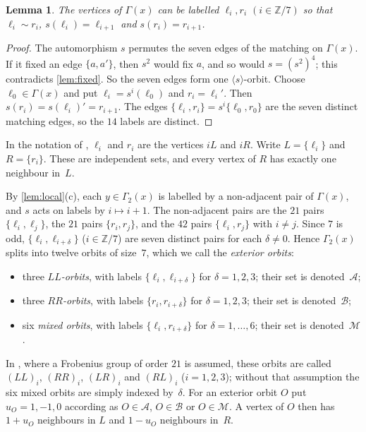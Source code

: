 \documentclass[11pt,a4paper]{amsart}
\newtheorem{lemma}[theorem]{Lemma}
\theoremstyle{definition}
\theoremstyle{remark}
\newcommand{\Z}{\mathbb{Z}}
\newcommand{\cA}{\mathcal{A}}
\newcommand{\cB}{\mathcal{B}}
\newcommand{\cM}{\mathcal{M}}
\begin{document}
\begin{lemma}\label{lem:labels}
The vertices of $\Gamma(x)$ can be labelled $\ell_i,r_i$ $(i\in\Z/7)$ so that $\ell_i\sim r_i$,
$s(\ell_i)=\ell_{i+1}$ and $s(r_i)=r_{i+1}$.
\end{lemma}

\begin{proof}
The automorphism $s$ permutes the seven edges of the matching on $\Gamma(x)$. If it fixed an edge
$\{a,a'\}$, then $s^2$ would fix $a$, and so would $s=(s^2)^4$; this contradicts \cref{lem:fixed}. So the
seven edges form one $\langle s\rangle$-orbit. Choose $\ell_0\in\Gamma(x)$ and put $\ell_i=s^i(\ell_0)$ and
$r_i=\ell_i'$. Then $s(r_i)=s(\ell_i)'=r_{i+1}$. The edges $\{\ell_i,r_i\}=s^i\{\ell_0,r_0\}$ are the seven
distinct matching edges, so the $14$ labels are distinct.
\end{proof}

In the notation of \cite{CW25}, $\ell_i$ and $r_i$ are the vertices $iL$ and $iR$. Write $L=\{\ell_i\}$ and
$R=\{r_i\}$. These are independent sets, and every vertex of $R$ has exactly one neighbour in~$L$.

By \cref{lem:local}(c), each $y\in\Gamma_2(x)$ is labelled by a non-adjacent pair of $\Gamma(x)$, and $s$ acts
on labels by $i\mapsto i+1$. The non-adjacent pairs are the $21$ pairs $\{\ell_i,\ell_j\}$, the $21$ pairs
$\{r_i,r_j\}$, and the $42$ pairs $\{\ell_i,r_j\}$ with $i\neq j$. Since $7$ is odd, $\{\ell_i,\ell_{i+\delta}\}$
($i\in\Z/7$) are seven distinct pairs for each $\delta\neq0$. Hence $\Gamma_2(x)$ splits into twelve orbits
of size~$7$, which we call the \emph{exterior orbits}:
\begin{itemize}
\item three \emph{$LL$-orbits}, with labels $\{\ell_i,\ell_{i+\delta}\}$ for $\delta=1,2,3$; their set is denoted~$\cA$;
\item three \emph{$RR$-orbits}, with labels $\{r_i,r_{i+\delta}\}$ for $\delta=1,2,3$; their set is denoted~$\cB$;
\item six \emph{mixed orbits}, with labels $\{\ell_i,r_{i+\delta}\}$ for $\delta=1,\dots,6$; their set is denoted~$\cM$.
\end{itemize}
In \cite[\S4]{CW25}, where a Frobenius group of order $21$ is assumed, these orbits are called $(LL)_i$,
$(RR)_i$, $(LR)_i$ and $(RL)_i$ ($i=1,2,3$); without that assumption the six mixed orbits are simply indexed
by~$\delta$. For an
exterior orbit $O$ put $u_O=1,-1,0$ according as $O\in\cA$, $O\in\cB$ or $O\in\cM$. A vertex of $O$ then has
$1+u_O$ neighbours in $L$ and $1-u_O$ neighbours in~$R$.
\end{document}
